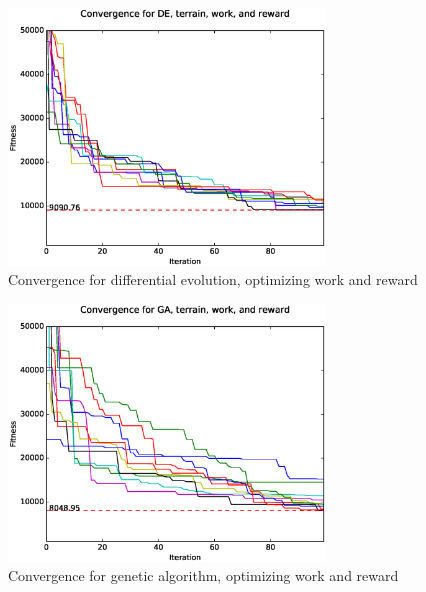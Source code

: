 \documentclass{tamuccthesis}
\begin{document}
\begin{figure}[H]
    \captionsetup{justification=centering}
    \centering
        \includegraphics[width=0.75\textwidth,trim={0cm 0.75cm 0cm 0.75cm},clip]{conv_DE_b.eps}
    \caption{Convergence for differential evolution, optimizing work and reward}
    \label{fig:convergence_b_DE}
\end{figure}

\begin{figure}[H]
    \captionsetup{justification=centering}
    \centering
        \includegraphics[width=0.75\textwidth,trim={0cm 0.75cm 0cm 0.75cm},clip]{conv_GA_b.eps}
    \caption{Convergence for genetic algorithm, optimizing work and reward}   
    \label{fig:convergence_b_SGA}
\end{figure}
\end{document}
